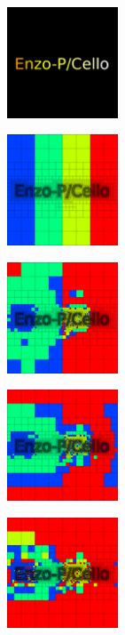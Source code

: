 \begin{frame}[fragile]
\secframetitle{\ssLoadBalance}
\begin{center}
\begin{minipage}{1.3in}
\includegraphics[width=1.3in]{Images/Balance/balance-de-00000.png}
\end{minipage}
\begin{minipage}{1.3in}
\includegraphics[width=1.3in]{Images/Balance/balance-mesh-00000.png}
\end{minipage}
\begin{minipage}{1.3in}
\includegraphics[width=1.3in]{Images/Balance/balance-mesh-00002.png}
\end{minipage}
\begin{minipage}{1.3in}
\includegraphics[width=1.3in]{Images/Balance/balance-mesh-00004.png}
\end{minipage}
\begin{minipage}{1.3in}
\includegraphics[width=1.3in]{Images/Balance/balance-mesh-00006.png}

\end{minipage}
\end{center}
\end{frame}
